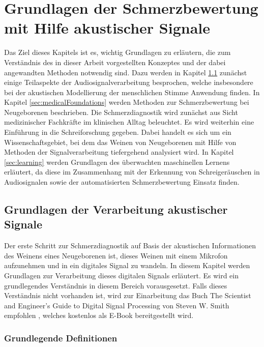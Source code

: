 \chapter{Grundlagen der Schmerzbewertung mit Hilfe akustischer Signale}
\label{sec:foundations}

Das Ziel dieses Kapitels ist es, wichtig Grundlagen zu erläutern, die zum Verständnis des in dieser Arbeit vorgestellten Konzeptes und der dabei angewandten Methoden notwendig sind. Dazu werden in Kapitel \ref{sec:signal_foundations} zunächst einige Teilaspekte der Audiosignalverarbeitung besprochen, welche insbesondere bei der akustischen Modellierung der menschlichen Stimme Anwendung finden. In Kapitel \ref{sec:medicalFoundations} werden Methoden zur Schmerzbewertung bei Neugeborenen beschrieben. Die Schmerzdiagnostik wird zunächst aus Sicht medizinischer Fachkräfte im klinischen Alltag beleuchtet. Es wird weiterhin eine Einführung in die \glqq Schreiforschung\grqq{} gegeben. Dabei handelt es sich um ein Wissenschaftsgebiet, bei dem das Weinen von Neugeborenen mit Hilfe von Methoden der Signalverarbeitung tiefergehend analysiert wird. In Kapitel \ref{sec:learning} werden Grundlagen des überwachten maschinellen Lernens erläutert, da diese im Zusammenhang mit der Erkennung von Schreigeräuschen in Audiosignalen sowie der automatisierten Schmerzbewertung Einsatz finden.

\section{Grundlagen der Verarbeitung akustischer Signale}
\label{sec:signal_foundations}

Der erste Schritt zur Schmerzdiagnostik auf Basis der akustischen Informationen des Weinens eines Neugeborenen ist, dieses Weinen mit einem Mikrofon aufzunehmen und in ein digitales Signal zu wandeln. In diesem Kapitel werden Grundlagen zur Verarbeitung dieses digitalen Signals erläutert. Es wird ein grundlegendes Verständnis in diesem Bereich vorausgesetzt. Falls dieses Verständnis nicht vorhanden ist, wird zur Einarbeitung das Buch \glqq The Scientist and Engineer's Guide to Digital Signal Processing\grqq{} von Steven W. Smith empfohlen \cite{dspGuide}, welches kostenlos als E-Book bereitgestellt wird.

\subsection{Grundlegende Definitionen}

